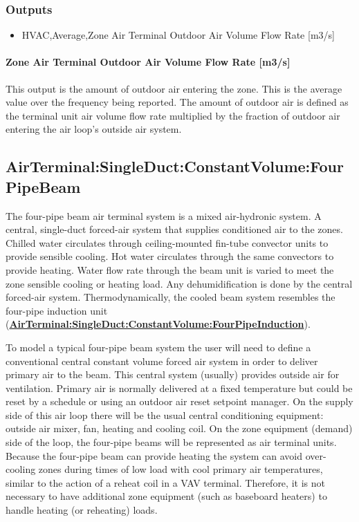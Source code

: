 \subsubsection{Outputs}\label{outputs-9}

\begin{itemize}
\item
  HVAC,Average,Zone Air Terminal Outdoor Air Volume Flow Rate {[}m3/s{]}
\end{itemize}

\paragraph{Zone Air Terminal Outdoor Air Volume Flow Rate {[}m3/s{]}}

This output is the amount of outdoor air entering the zone. This is the average value over the frequency being reported. The amount of outdoor air is defined as the terminal unit air volume flow rate multiplied by the fraction of outdoor air entering the air loop's outside air system.

\subsection{AirTerminal:SingleDuct:ConstantVolume:FourPipeBeam}\label{airterminalsingleductconstantvolumefourpipebeam}

The four-pipe beam air terminal system is a mixed air-hydronic system. A central, single-duct forced-air system that supplies conditioned air to the zones. Chilled water circulates through ceiling-mounted fin-tube convector units to provide sensible cooling. Hot water circulates through the same convectors to provide heating. Water flow rate through the beam unit is varied to meet the zone sensible cooling or heating load. Any dehumidification is done by the central forced-air system. Thermodynamically, the cooled beam system resembles the four-pipe induction unit (\textbf{\hyperref[airterminalsingleductconstantvolumefourpipeinduction]{AirTerminal:SingleDuct:ConstantVolume:FourPipeInduction}}).

To model a typical four-pipe beam system the user will need to define a conventional central constant volume forced air system in order to deliver primary air to the beam. This central system (usually) provides outside air for ventilation. Primary air is normally delivered at a fixed temperature but could be reset by a schedule or using an outdoor air reset setpoint manager. On the supply side of this air loop there will be the usual central conditioning equipment: outside air mixer, fan, heating and cooling coil. On the zone equipment (demand) side of the loop, the four-pipe beams will be represented as air terminal units. Because the four-pipe beam can provide heating the system can avoid over-cooling zones during times of low load with cool primary air temperatures, similar to the action of a reheat coil in a VAV terminal. Therefore, it is not necessary to have additional zone equipment (such as baseboard heaters) to handle heating (or reheating) loads.


